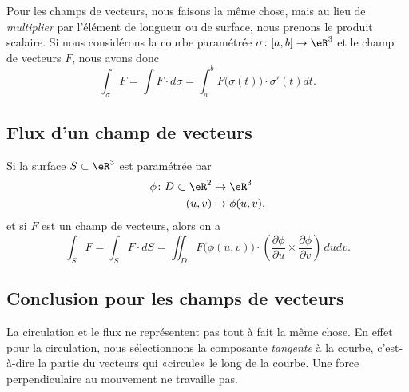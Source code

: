 Pour les champs de vecteurs, nous faisons la même chose, mais au lieu de \emph{multiplier} par l'élément de longueur ou de surface, nous prenons le produit scalaire. Si nous considérons la courbe paramétrée $\sigma\colon \mathopen[ a , b \mathclose]\to \eR^3$ et le champ de vecteurs $F$, nous avons donc
\begin{equation}
	\int_{\sigma}F=\int F\cdot d\sigma=\int_a^bF\big( \sigma(t) \big)\cdot\sigma'(t)dt.
\end{equation}

\subsection{Flux d'un champ de vecteurs}

Si la surface $S\subset\eR^3$ est paramétrée par
\begin{equation}
	\begin{aligned}
		\phi\colon D\subset\eR^2 & \to \eR^3          \\
		(u,v)                    & \mapsto \phi(u,v),
	\end{aligned}
\end{equation}
et si $F$ est un champ de vecteurs, alors on a
\begin{equation}        \label{EqResIntFluxPhi}
	\int_SF=\int_S F\cdot dS=\iint_D F\big( \phi(u,v) \big)\cdot\left( \frac{ \partial \phi }{ \partial u }\times\frac{ \partial \phi }{ \partial v } \right)\,dudv.
\end{equation}

\subsection{Conclusion pour les champs de vecteurs}

La circulation et le flux ne représentent pas tout à fait la même chose. En effet pour la circulation, nous sélectionnons la composante \emph{tangente} à la courbe, c'est-à-dire la partie du vecteurs qui «circule» le long de la courbe. Une force perpendiculaire au mouvement ne travaille pas.

